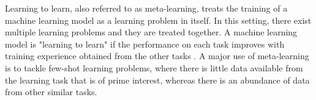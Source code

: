 
Learning to learn, also referred to as meta-learning, treats the training of a machine learning model as a learning problem in itself. In this setting, there exist multiple learning problems and they are treated together. A machine learning model is "learning to learn" if the performance on each task improves with training experience obtained from the other tasks \cite{thrun1998}. A major use of meta-learning is to tackle few-shot learning problems, where there is little data available from the learning task that is of prime interest, whereas there is an abundance of data from other similar tasks. 



